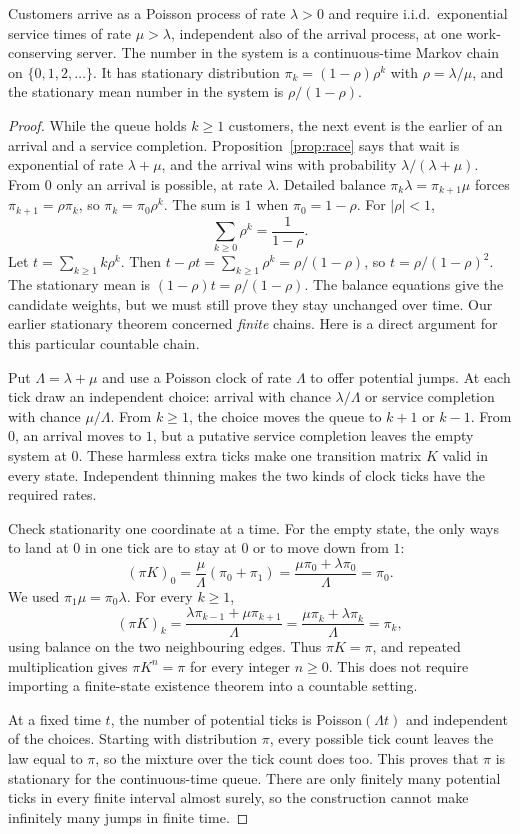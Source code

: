 \begin{theorem}[M/M/1]\label{thm:mm1}
Customers arrive as a Poisson process of rate $\lambda>0$ and require i.i.d.\ exponential service times of rate $\mu>\lambda$, independent also of the arrival process, at one work-conserving server. The number in the system is a continuous-time Markov chain on $\{0,1,2,\ldots\}$. It has stationary distribution $\pi_k=(1-\rho)\rho^k$ with $\rho=\lambda/\mu$, and the stationary mean number in the system is $\rho/(1-\rho)$.
\end{theorem}
\begin{proof}
While the queue holds $k\ge1$ customers, the next event is the earlier of an arrival and a service completion. Proposition~\ref{prop:race} says that wait is exponential of rate $\lambda+\mu$, and the arrival wins with probability $\lambda/(\lambda+\mu)$. From $0$ only an arrival is possible, at rate $\lambda$. Detailed balance $\pi_k\lambda=\pi_{k+1}\mu$ forces $\pi_{k+1}=\rho\pi_k$, so $\pi_k=\pi_0\rho^k$. The sum is $1$ when $\pi_0=1-\rho$. For $|\rho|<1$,
\[
 \sum_{k\ge0}\rho^k=\frac1{1-\rho}.
\]
Let $t=\sum_{k\ge1}k\rho^k$. Then $t-\rho t=\sum_{k\ge1}\rho^k=\rho/(1-\rho)$, so $t=\rho/(1-\rho)^2$. The stationary mean is $(1-\rho)t=\rho/(1-\rho)$. The balance equations give the candidate weights, but we must still prove they stay unchanged over time. Our earlier stationary theorem concerned \emph{finite} chains. Here is a direct argument for this particular countable chain.

Put $\Lambda=\lambda+\mu$ and use a Poisson clock of rate $\Lambda$ to offer potential jumps. At each tick draw an independent choice: arrival with chance $\lambda/\Lambda$ or service completion with chance $\mu/\Lambda$. From $k\ge1$, the choice moves the queue to $k+1$ or $k-1$. From $0$, an arrival moves to $1$, but a putative service completion leaves the empty system at $0$. These harmless extra ticks make one transition matrix $K$ valid in every state. Independent thinning makes the two kinds of clock ticks have the required rates.

Check stationarity one coordinate at a time. For the empty state, the only ways to land at $0$ in one tick are to stay at $0$ or to move down from $1$:
\[
 (\pi K)_0=\frac{\mu}{\Lambda}(\pi_0+\pi_1)
           =\frac{\mu\pi_0+\lambda\pi_0}{\Lambda}=\pi_0.
\]
We used $\pi_1\mu=\pi_0\lambda$. For every $k\ge1$,
\[
 (\pi K)_k=\frac{\lambda\pi_{k-1}+\mu\pi_{k+1}}{\Lambda}
          =\frac{\mu\pi_k+\lambda\pi_k}{\Lambda}=\pi_k,
\]
using balance on the two neighbouring edges. Thus $\pi K=\pi$, and repeated multiplication gives $\pi K^n=\pi$ for every integer $n\ge0$. This does not require importing a finite-state existence theorem into a countable setting.

At a fixed time $t$, the number of potential ticks is Poisson$(\Lambda t)$ and independent of the choices. Starting with distribution $\pi$, every possible tick count leaves the law equal to $\pi$, so the mixture over the tick count does too. This proves that $\pi$ is stationary for the continuous-time queue. There are only finitely many potential ticks in every finite interval almost surely, so the construction cannot make infinitely many jumps in finite time.
\end{proof}

